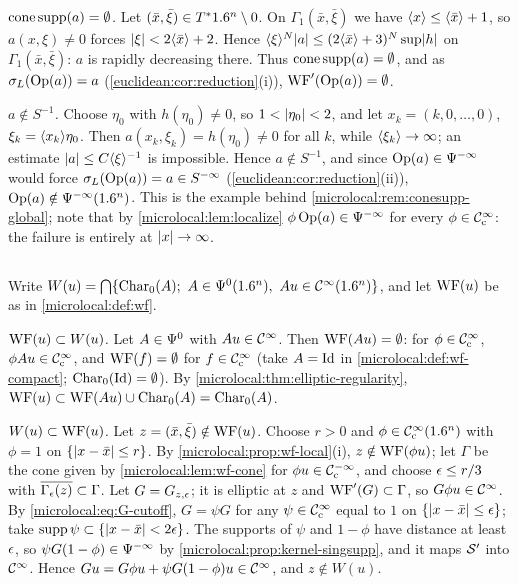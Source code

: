 \emph{$\operatorname{cone\,supp}(a)=\emptyset$.} Let $(\bar x,\bar\xi)\in T^*1.6^n\setminus0$. On
$\Gamma_1(\bar x,\bar\xi)$ we have $\langle x\rangle\le\langle \bar x\rangle+1$, so $a(x,\xi)\ne0$ forces
$\lvert \xi\rvert<2\langle \bar x\rangle+2$. Hence $\langle \xi\rangle^N\lvert a\rvert\le(2\langle \bar x\rangle+3)^N\sup\lvert h\rvert$ on
$\Gamma_1(\bar x,\bar\xi)$: $a$ is rapidly decreasing there. Thus $\operatorname{cone\,supp}(a)=\emptyset$, and as
$\sigma_L(\operatorname{Op}(a))=a$ (\cref{euclidean:cor:reduction}(i)), $\operatorname{WF}'(\operatorname{Op}(a))=\emptyset$.

\emph{$a\notin S^{-1}$.} Choose $\eta_0$ with $h(\eta_0)\ne0$, so $1<\lvert \eta_0\rvert<2$, and let
$x_k=(k,0,\dots,0)$, $\xi_k=\langle x_k\rangle\eta_0$. Then $a(x_k,\xi_k)=h(\eta_0)\ne0$ for all $k$, while
$\langle \xi_k\rangle\to\infty$; an estimate $\lvert a\rvert\le C\langle \xi\rangle^{-1}$ is impossible. Hence
$a\notin S^{-1}$, and since $\operatorname{Op}(a)\in\Psi^{-\infty}$ would force $\sigma_L(\operatorname{Op}(a))=a\in S^{-\infty}$
(\cref{euclidean:cor:reduction}(ii)), $\operatorname{Op}(a)\notin\Psi^{-\infty}(1.6^n)$. This is the example
behind \cref{microlocal:rem:conesupp-global}; note that by \cref{microlocal:lem:localize}
$\phi\operatorname{Op}(a)\in\Psi^{-\infty}$ for every $\phi\in\mathcal{C}^\infty_{\mathrm{c}}$: the failure is entirely at
$\lvert x\rvert\to\infty$.

\subsection*{}
Write $W(u)=\bigcap\{\Char_0(A);\ A\in\Psido0(\R^n),\ Au\in\CI(\R^n)\}$, and let $\operatorname{WF}(u)$ be as in
\cref{microlocal:def:wf}.

\emph{$\operatorname{WF}(u)\subset W(u)$.} Let $A\in\Psi^{0}$ with $Au\in\mathcal{C}^\infty$. Then $\operatorname{WF}(Au)=\emptyset$: for
$\phi\in\mathcal{C}^\infty_{\mathrm{c}}$, $\phi Au\in\mathcal{C}^\infty_{\mathrm{c}}$, and $\operatorname{WF}(f)=\emptyset$ for $f\in\mathcal{C}^\infty_{\mathrm{c}}$ (take $A=\operatorname{Id}$ in
\cref{microlocal:def:wf-compact}; $\operatorname{Char}_0(\operatorname{Id})=\emptyset$). By
\cref{microlocal:thm:elliptic-regularity}, $\operatorname{WF}(u)\subset\operatorname{WF}(Au)\cup\operatorname{Char}_0(A)=\operatorname{Char}_0(A)$.

\emph{$W(u)\subset\operatorname{WF}(u)$.} Let $z=(\bar x,\bar\xi)\notin\operatorname{WF}(u)$. Choose $r>0$ and
$\phi\in\mathcal{C}^\infty_{\mathrm{c}}(1.6^n)$ with $\phi=1$ on $\{\lvert x-\bar x\rvert\le r\}$. By
\cref{microlocal:prop:wf-local}(i), $z\notin\operatorname{WF}(\phi u)$; let $\Gamma$ be the cone given by
\cref{microlocal:lem:wf-cone} for $\phi u\in\mathcal{C}^{-\infty}_{\mathrm{c}}$, and choose $\epsilon\le r/3$ with
$\overline{\Gamma_\epsilon(z)}\subset\Gamma$. Let $G=G_{z,\epsilon}$; it is elliptic at $z$ and
$\operatorname{WF}'(G)\subset\Gamma$, so $G\phi u\in\mathcal{C}^\infty$. By \eqref{microlocal:eq:G-cutoff}, $G=\psi G$ for any
$\psi\in\mathcal{C}^\infty_{\mathrm{c}}$ equal to $1$ on $\{\lvert x-\bar x\rvert\le\epsilon\}$; take $\operatorname{supp}\psi\subset\{\lvert x-\bar x\rvert<2\epsilon\}$.
The supports of $\psi$ and $1-\phi$ have distance at least $\epsilon$, so $\psi G(1-\phi)\in\Psi^{-\infty}$
by \cref{microlocal:prop:kernel-singsupp}, and it maps $\mathcal{S}'$ into $\mathcal{C}^\infty$. Hence
$Gu=G\phi u+\psi G(1-\phi)u\in\mathcal{C}^\infty$, and $z\notin W(u)$.

